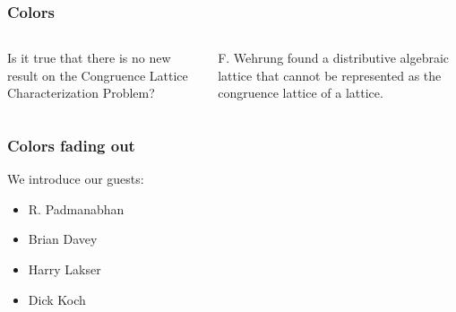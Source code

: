 \documentclass{beamer}
\begin{document}

\begin{frame}
\frametitle{Colors}

\begin{columns}[t]
  \begin{column}{2in}
{\color{red}Is it true that there is no new result
on the Congruence Lattice Characterization Problem?}
  \end{column}
    \begin{column}{2in}
{\color{green}F. Wehrung found a distributive 
algebraic lattice that cannot be represented 
as the congruence lattice of a lattice.}
  \end{column}
\end{columns}
\end{frame}


\begin{frame}
\frametitle{Colors fading out}

We introduce our guests:
\begin{itemize}
\item {\color{red}R. Padmanabhan}
\item {\color{red!60!white}Brian Davey}
\item {\color{red!40!white}Harry Lakser}
\item {\color{red!20!white}Dick Koch}
\end{itemize}
\end{frame}
\end{document}
